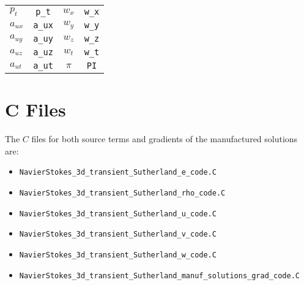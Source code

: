 \documentclass[10pt]{article}
\begin{document}
\begin{table}[hptb]
\begin{tabular}{l c | c c}
$ p_{t}$      & \texttt{p\_t}   	&  $ w_{x}$ 	& \texttt{w\_x}   \\
$ a_{ux}$ 	  & \texttt{a\_ux}      &  $ w_{y}$ 	& \texttt{w\_y}   \\
$ a_{uy}$ 	  & \texttt{a\_uy}      &  $ w_{z}$ 	& \texttt{w\_z}   \\ 
$ a_{uz}$ 	  & \texttt{a\_uz}      &  $w_{t}$ 	    & \texttt{w\_t}  \\
$ a_{ut}$ 	  & \texttt{a\_ut}      &  $\pi$        & \texttt{PI}  \\
\hline
\end{tabular}
\label{table_aux_var02}
\end{table}






\section{C Files}
The $C$ files for both source terms and gradients of the  manufactured solutions are:
\begin{itemize}
 \item \texttt{NavierStokes\_3d\_transient\_Sutherland\_e\_code.C} \vspace{-6pt}
 \item \texttt{NavierStokes\_3d\_transient\_Sutherland\_rho\_code.C}\vspace{-6pt}
 \item \texttt{NavierStokes\_3d\_transient\_Sutherland\_u\_code.C}\vspace{-6pt}
 \item \texttt{NavierStokes\_3d\_transient\_Sutherland\_v\_code.C}\vspace{-6pt}
 \item \texttt{NavierStokes\_3d\_transient\_Sutherland\_w\_code.C}\vspace{-6pt}
 \item \texttt{NavierStokes\_3d\_transient\_Sutherland\_manuf\_solutions\_grad\_code.C}
\end{itemize}
\end{document}
